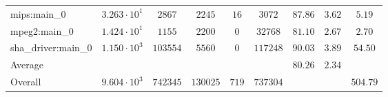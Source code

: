 \begin{tabular}{|l|c|c|c|c|c|c|c|c|}
mips:main\_0            & $ 3.263 \cdot 10^{1} $ & $ 2867   $ & $ 2245   $ & $ 16  $ & $ 3072   $ & $ 87.86       $ & $ 3.62    $ & $ 5.19    $ \\
mpeg2:main\_0           & $ 1.424 \cdot 10^{1} $ & $ 1155   $ & $ 2200   $ & $ 0   $ & $ 32768  $ & $ 81.10       $ & $ 2.67    $ & $ 2.70    $ \\
sha\_driver:main\_0     & $ 1.150 \cdot 10^{3} $ & $ 103554 $ & $ 5560   $ & $ 0   $ & $ 117248 $ & $ 90.03       $ & $ 3.89    $ & $ 54.50   $ \\
\hline
Average                 & $                    $ & $        $ & $        $ & $     $ & $        $ & $ 80.26       $ & $ 2.34    $ & $         $ \\
\hline
Overall                 & $ 9.604 \cdot 10^{3} $ & $ 742345 $ & $ 130025 $ & $ 719 $ & $ 737304 $ & $             $ & $         $ & $ 504.79  $ \\
\hline
\end{tabular}
